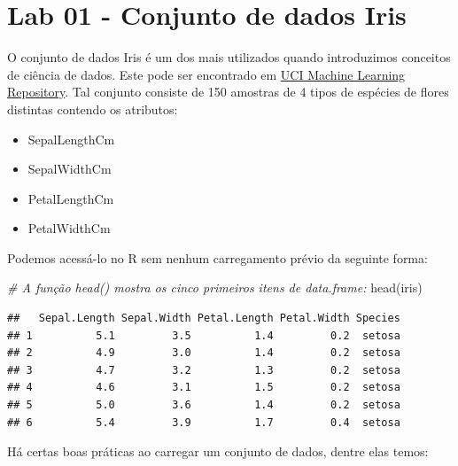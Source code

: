 \documentclass[
]{book}
\newenvironment{Shaded}{\begin{snugshade}}{\end{snugshade}}
\newcommand{\CommentTok}[1]{\textcolor[rgb]{0.56,0.35,0.01}{\textit{#1}}}
\newcommand{\FunctionTok}[1]{\textcolor[rgb]{0.00,0.00,0.00}{#1}}
\newcommand{\NormalTok}[1]{#1}
\begin{document}
\hypertarget{lab-01---conjunto-de-dados-iris}{%
\section{Lab 01 - Conjunto de dados Iris}\label{lab-01---conjunto-de-dados-iris}}

O conjunto de dados Iris é um dos mais utilizados quando introduzimos conceitos de ciência de dados. Este pode ser encontrado em \href{http://archive.ics.uci.edu/ml/index.php}{UCI Machine Learning Repository}. Tal conjunto consiste de 150 amostras de 4 tipos de espécies de flores distintas contendo os atributos:

\begin{itemize}
\item
  SepalLengthCm
\item
  SepalWidthCm
\item
  PetalLengthCm
\item
  PetalWidthCm
\end{itemize}

Podemos acessá-lo no R sem nenhum carregamento prévio da seguinte forma:

\begin{Shaded}
\begin{Highlighting}[]
\CommentTok{\# A função head() mostra os cinco primeiros itens de data.frame:}
\FunctionTok{head}\NormalTok{(iris)}
\end{Highlighting}
\end{Shaded}

\begin{verbatim}
##   Sepal.Length Sepal.Width Petal.Length Petal.Width Species
## 1          5.1         3.5          1.4         0.2  setosa
## 2          4.9         3.0          1.4         0.2  setosa
## 3          4.7         3.2          1.3         0.2  setosa
## 4          4.6         3.1          1.5         0.2  setosa
## 5          5.0         3.6          1.4         0.2  setosa
## 6          5.4         3.9          1.7         0.4  setosa
\end{verbatim}

Há certas boas práticas ao carregar um conjunto de dados, dentre elas temos:
\end{document}
